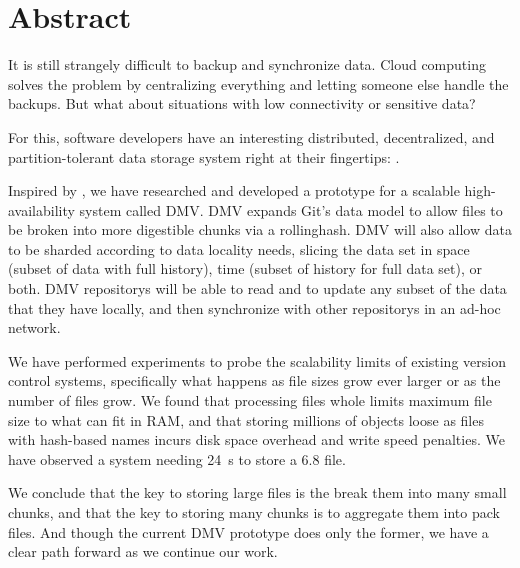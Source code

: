 \chapter{Abstract}

\glsunsetall
{}


It is still strangely difficult to backup and synchronize data. Cloud computing
solves the problem by centralizing everything and letting someone else handle
the backups. But what about situations with low connectivity or sensitive data?


For this, software developers have an interesting distributed, decentralized,
and partition-tolerant data storage system right at their fingertips:
.


Inspired by , we have researched and
developed a prototype for a scalable high-availability system called \gls{DMV}.
\gls{DMV} expands Git's data model  to allow files to be broken into more
digestible chunks via a \gls{rollinghash}. \gls{DMV} will also allow data to be
sharded according to data locality needs, slicing the data set in space (subset
of data with full history), time (subset of history for full data set), or both.
\gls{DMV} \glspl{repository} will be able to read and to update any subset of
the data that they have locally, and then synchronize with other
\glspl{repository} in an ad-hoc network.


We have performed experiments to probe the scalability limits of existing
version control systems, specifically what happens as file sizes grow ever
larger or as the number of files grow. We found that processing files whole
limits maximum file size to what can fit in RAM, and that storing millions of
objects loose as files with hash-based names incurs disk space overhead and
write speed penalties. We have observed a system needing \SI{24}{\second} to
store a \SI{6.8}{\kib} file.





We conclude that the key to storing large files is the break them into many
small chunks, and that the key to storing many chunks is to aggregate them into
pack files. And though the current \gls{DMV} prototype does only the former, we
have a clear path forward as we continue our work.

%


\glsresetall
